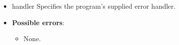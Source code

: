 \documentclass{report}
\begin{document}
\begin{itemize}
        \begin{itemize}
            \item handler Specifies the program’s supplied error handler.
        \end{itemize}

        \begin{itemize}
            \item \textbf{Possible errors}:
            \begin{itemize}
                \item None.
            \end{itemize}
        \end{itemize}


    \end{itemize}


    \pagebreak 
\end{document}
